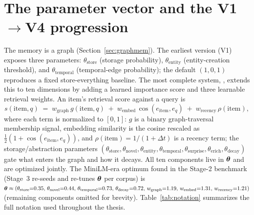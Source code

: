 \section{The parameter vector and the V1$\rightarrow$V4 progression}
\label{sec:theta}
The memory is a graph (Section~\ref{sec:graphmem}). The earliest version (V1)
exposes three parameters: $\theta_{\mathrm{store}}$ (storage probability),
$\theta_{\mathrm{entity}}$ (entity-creation threshold), and
$\theta_{\mathrm{temporal}}$ (temporal-edge probability); the default
$(1,0,1)$ reproduces a fixed store-everything baseline. The most complete system,
\Vfour{}, extends this to ten dimensions by adding a learned importance score and
three learnable retrieval weights. An item's retrieval score against a query is
\begin{equation}
s(\text{item}, q) \;=\;
w_{\mathrm{graph}}\, g(\text{item}, q) \;+\;
w_{\mathrm{embed}}\, \cos(e_{\text{item}}, e_q) \;+\;
w_{\mathrm{recency}}\, \rho(\text{item}),
\label{eq:score}
\end{equation}
where each term is normalized to $[0,1]$: $g$ is a binary graph-traversal
membership signal, embedding similarity is the cosine rescaled as
$\tfrac{1}{2}(1{+}\cos(e_{\text{item}},e_q))$, and $\rho(\text{item})=1/(1+\Delta t)$
is a recency term; the storage/abstraction parameters
$(\theta_{\mathrm{store}}, \theta_{\mathrm{novel}}, \theta_{\mathrm{entity}},
\theta_{\mathrm{temporal}}, \theta_{\mathrm{surprise}}, \theta_{\mathrm{erich}},
\theta_{\mathrm{decay}})$ gate what enters the graph and how it decays. All ten
components live in $\boldsymbol{\theta}$ and are optimized jointly. The MiniLM-era \Vfour{}
optimum found in the Stage-2 benchmark (Stage~3 re-seeds and re-tunes
$\boldsymbol{\theta}$ per corpus) is
$\boldsymbol{\theta} \approx (\theta_{\mathrm{store}}{=}0.35,\,
\theta_{\mathrm{novel}}{=}0.44,\, \theta_{\mathrm{temporal}}{=}0.73,\,
\theta_{\mathrm{decay}}{=}0.72,\, w_{\mathrm{graph}}{=}1.19,\,
w_{\mathrm{embed}}{=}1.31,\, w_{\mathrm{recency}}{=}1.21)$ (remaining components
omitted for brevity). Table~\ref{tab:notation} summarizes the full notation used
throughout the thesis.

